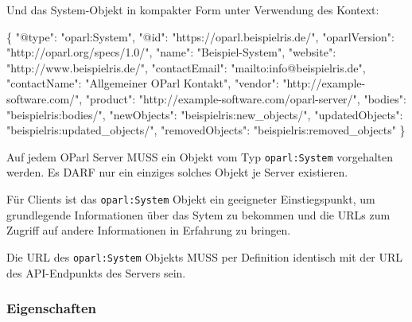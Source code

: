\documentclass[,a4paper]{article}
\newenvironment{Shaded}{}{}
\newcommand{\DataTypeTok}[1]{\textcolor[rgb]{0.56,0.13,0.00}{{#1}}}
\newcommand{\StringTok}[1]{\textcolor[rgb]{0.25,0.44,0.63}{{#1}}}
\newcommand{\NormalTok}[1]{{#1}}
\begin{document}
Und das System-Objekt in kompakter Form unter Verwendung des Kontext:

\begin{Shaded}
\begin{Highlighting}[]
\NormalTok{\{}
    \DataTypeTok{"@type"}\NormalTok{: }\StringTok{"oparl:System"}\NormalTok{,}
    \DataTypeTok{"@id"}\NormalTok{: }\StringTok{"https://oparl.beispielris.de/"}\NormalTok{,}
    \DataTypeTok{"oparlVersion"}\NormalTok{: }\StringTok{"http://oparl.org/specs/1.0/"}\NormalTok{,}
    \DataTypeTok{"name"}\NormalTok{: }\StringTok{"Beispiel-System"}\NormalTok{,}
    \DataTypeTok{"website"}\NormalTok{: }\StringTok{"http://www.beispielris.de/"}\NormalTok{,}
    \DataTypeTok{"contactEmail"}\NormalTok{: }\StringTok{"mailto:info@beispielris.de"}\NormalTok{,}
    \DataTypeTok{"contactName"}\NormalTok{: }\StringTok{"Allgemeiner OParl Kontakt"}\NormalTok{,}
    \DataTypeTok{"vendor"}\NormalTok{: }\StringTok{"http://example-software.com/"}\NormalTok{,}
    \DataTypeTok{"product"}\NormalTok{: }\StringTok{"http://example-software.com/oparl-server/"}\NormalTok{,}
    \DataTypeTok{"bodies"}\NormalTok{: }\StringTok{"beispielris:bodies/"}\NormalTok{,}
    \DataTypeTok{"newObjects"}\NormalTok{: }\StringTok{"beispielris:new_objects/"}\NormalTok{,}
    \DataTypeTok{"updatedObjects"}\NormalTok{: }\StringTok{"beispielris:updated_objects/"}\NormalTok{,}
    \DataTypeTok{"removedObjects"}\NormalTok{: }\StringTok{"beispielris:removed_objects"}
\NormalTok{\}}
\end{Highlighting}
\end{Shaded}

Auf jedem OParl Server MUSS ein Objekt vom Typ \texttt{oparl:System}
vorgehalten werden. Es DARF nur ein einziges solches Objekt je Server
existieren.

Für Clients ist das \texttt{oparl:System} Objekt ein geeigneter
Einstiegspunkt, um grundlegende Informationen über das Sytem zu bekommen
und die URLs zum Zugriff auf andere Informationen in Erfahrung zu
bringen.

Die URL des \texttt{oparl:System} Objekts MUSS per Definition identisch
mit der URL des API-Endpunkts des Servers sein.

\subsubsection{Eigenschaften}\label{eigenschaften}
\end{document}
